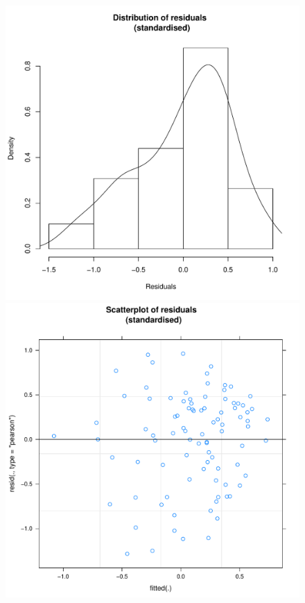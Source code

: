 \begin{CJK}{UTF8}{gbsn}
            \begin{figure}[htbp]
              \includegraphics[scale =.4]{images/MLM3aOutHist.pdf}
              \includegraphics[scale =.4]{images/MLM3aOutScatter.pdf}

\end{figure}
\end{CJK}
